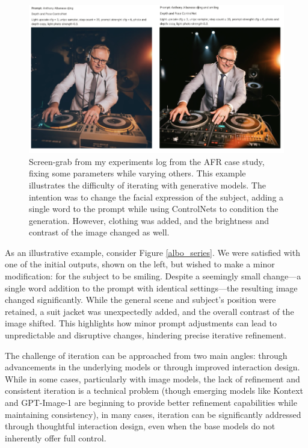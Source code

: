 \begin{figure}[H]
    \centering
    \includegraphics[width=1\linewidth]{alboexperiments.png}
    \caption{Screen-grab from my experiments log from the AFR case study, fixing some parameters while varying others. This example illustrates the difficulty of iterating with generative models. The intention was to change the facial expression of the subject, adding a single word to the prompt while using ControlNets to condition the generation. However, clothing was added, and the brightness and contrast of the image changed as well.}
    \label{fig:albo_series}
\end{figure}

As an illustrative example, consider Figure \ref{albo_series}. We were satisfied with one of the initial outputs, shown on the left, but wished to make a minor modification: for the subject to be smiling. Despite a seemingly small change—a single word addition to the prompt with identical settings—the resulting image changed significantly. While the general scene and subject's position were retained, a suit jacket was unexpectedly added, and the overall contrast of the image shifted. This highlights how minor prompt adjustments can lead to unpredictable and disruptive changes, hindering precise iterative refinement.

The challenge of iteration can be approached from two main angles: through advancements in the underlying models or through improved interaction design. While in some cases, particularly with image models, the lack of refinement and consistent iteration is a technical problem (though emerging models like Kontext and GPT-Image-1 are beginning to provide better refinement capabilities while maintaining consistency), in many cases, iteration can be significantly addressed through thoughtful interaction design, even when the base models do not inherently offer full control.

